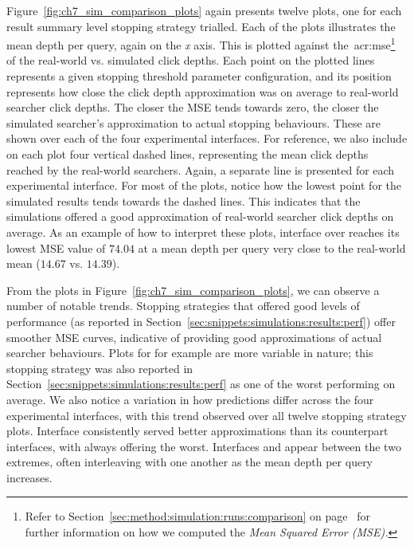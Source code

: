 Figure~\ref{fig:ch7_sim_comparison_plots} again presents twelve plots, one for each result summary level stopping strategy trialled. Each of the plots illustrates the mean depth per query, again on the \emph{x} axis. This is plotted against the~\gls{acr:mse}\footnote{Refer to Section~\ref{sec:method:simulation:runs:comparison} on page~\pageref{sec:method:simulation:runs:comparison} for further information on how we computed the \emph{Mean Squared Error (MSE).}} of the real-world vs. simulated click depths. Each point on the plotted lines represents a given stopping threshold parameter configuration, and its position represents how close the click depth approximation was on average to real-world searcher click depths. The closer the MSE tends towards zero, the closer the simulated searcher's approximation to actual stopping behaviours. These are shown over each of the four experimental interfaces. For reference, we also include on each plot four vertical dashed lines, representing the mean click depths reached by the real-world searchers. Again, a separate line is presented for each experimental interface. For most of the plots, notice how the lowest point for the simulated results tends towards the dashed lines. This indicates that the simulations offered a good approximation of real-world searcher click depths on average. As an example of how to interpret these plots, interface  over  reaches its lowest MSE value of $74.04$ at a mean depth per query very close to the real-world mean ($14.67$ vs. $14.39$).

From the plots in Figure~\ref{fig:ch7_sim_comparison_plots}, we can observe a number of notable trends. Stopping strategies that offered good levels of performance (as reported in Section~\ref{sec:snippets:simulations:results:perf}) offer smoother MSE curves, indicative of providing good approximations of actual searcher behaviours. Plots for  for example are more variable in nature; this stopping strategy was also reported in Section~\ref{sec:snippets:simulations:results:perf} as one of the worst performing on average. We also notice a variation in how predictions differ across the four experimental interfaces, with this trend observed over all twelve stopping strategy plots. Interface  consistently served better approximations than its counterpart interfaces, with  always offering the worst. Interfaces  and  appear between the two extremes, often interleaving with one another as the mean depth per query increases.

